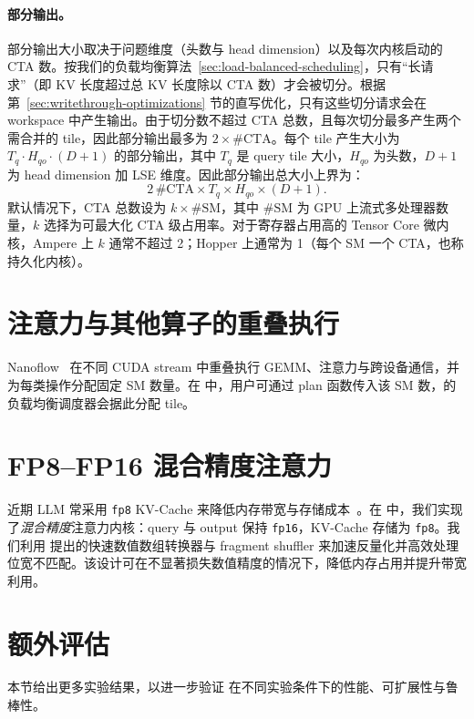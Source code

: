 \paragraph{部分输出。} 部分输出大小取决于问题维度（头数与 head dimension）以及每次内核启动的 CTA 数。按我们的负载均衡算法~\ref{sec:load-balanced-scheduling}，只有“长请求”（即 KV 长度超过总 KV 长度除以 CTA 数）才会被切分。根据第~\ref{sec:writethrough-optimizations} 节的直写优化，只有这些切分请求会在 workspace 中产生输出。由于切分数不超过 CTA 总数，且每次切分最多产生两个需合并的 tile，因此部分输出最多为 \(2 \times \#\text{CTA}\)。每个 tile 产生大小为 \(T_q \cdot H_{qo} \cdot (D+1)\) 的部分输出，其中 \(T_q\) 是 query tile 大小，\(H_{qo}\) 为头数，\(D+1\) 为 head dimension 加 LSE 维度。因此部分输出总大小上界为：
\[
  2\,\#\text{CTA} \times T_q \times H_{qo} \times (D + 1).
\]
默认情况下，CTA 总数设为 $k \times \#\text{SM}$，其中 $\#\text{SM}$ 为 GPU 上流式多处理器数量，$k$ 选择为可最大化 CTA 级占用率。对于寄存器占用高的 Tensor Core 微内核，Ampere 上 $k$ 通常不超过 2；Hopper 上通常为 1（每个 SM 一个 CTA，也称持久化内核）。

\section{注意力与其他算子的重叠执行}
\label{sec:overlap-attention}

Nanoflow~\cite{zhu2024nanoflow} 在不同 CUDA stream 中重叠执行 GEMM、注意力与跨设备通信，并为每类操作分配固定 SM 数量。在 \sys 中，用户可通过 plan 函数传入该 SM 数，\sys 的负载均衡调度器会据此分配 tile。

\section{FP8--FP16 混合精度注意力}
\label{sec:mixed-precision}

近期 LLM 常采用 \texttt{fp8} KV-Cache 来降低内存带宽与存储成本~\cite{micikevicius2022fp8}。在 \sys 中，我们实现了\emph{混合精度}注意力内核：query 与 output 保持 \texttt{fp16}，KV-Cache 存储为 \texttt{fp8}。我们利用 \citet{gupta2024mixed} 提出的快速数值数组转换器与 fragment shuffler 来加速反量化并高效处理位宽不匹配。该设计可在不显著损失数值精度的情况下，降低内存占用并提升带宽利用。


\section{额外评估}
\label{sec:additional-evaluation}

本节给出更多实验结果，以进一步验证 \sys 在不同实验条件下的性能、可扩展性与鲁棒性。


